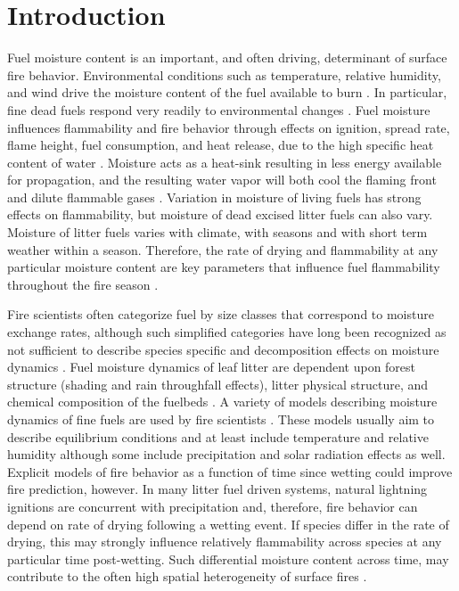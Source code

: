 \documentclass[fire,article,submit,moreauthors,pdftex]{Definitions/mdpi}
\begin{document}

\section{Introduction}

Fuel moisture content is an important, and often driving, determinant of
surface fire behavior. Environmental conditions such as temperature, relative
humidity, and wind drive the moisture content of the fuel available to burn
\cite{Kreye+Varner+etal-2018}. In particular, fine dead fuels respond very
readily to environmental changes \cite{Nelson-2001}. Fuel moisture influences
flammability and fire behavior through effects on ignition, spread rate, flame
height, fuel consumption, and heat release, due to the high specific heat
content of water \cite{Rothermel-1972, Nelson-2011}. Moisture acts as a
heat-sink resulting in less energy available for propagation, and the resulting
water vapor will both cool the flaming front and dilute flammable gases
\cite{Albini-1976, Shafizadeh-1977}. Variation in moisture of living fuels has
strong effects on flammability, but moisture of dead excised litter fuels can
also vary. Moisture of litter fuels varies with climate, with seasons and with
short term weather within a season. Therefore, the rate of drying and
flammability at any particular moisture content are key parameters that
influence fuel flammability throughout the fire season \cite{Nelson-2001}.

Fire scientists often categorize fuel by size classes that correspond to moisture exchange rates, although such simplified categories have long been recognized as not sufficient to describe species specific and decomposition effects on moisture dynamics \cite{Anderson-1985}. Fuel moisture dynamics of leaf litter are dependent upon forest structure (shading and rain throughfall effects), litter physical structure, and chemical composition of the fuelbeds \cite{Nelson+Hiers-2008, Matthews-2014, Kreye_Hiers_etal-2018}. A variety of models describing moisture dynamics of fine fuels are used by fire scientists \cite{Viney-1991, Nelson-2000, Catchpole+Catchpole+etal-2001}. These models usually aim to describe equilibrium conditions and at least  include temperature and relative humidity although some include precipitation and solar radiation effects as well. Explicit models of fire behavior as a function of time since wetting could improve fire prediction, however. In many litter fuel driven systems, natural lightning ignitions are concurrent with precipitation and, therefore, fire behavior can depend on rate of drying following a wetting event. If species differ in the rate of drying, this may strongly influence relatively flammability across species at any particular time post-wetting. Such differential moisture content across time, may contribute to the often high spatial heterogeneity of surface fires \cite{Knapp_Schwilk_etal-2006, Kreye_Hiers_etal-2018}.
\end{document}
